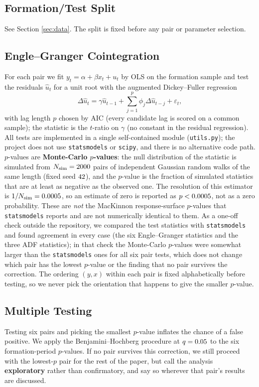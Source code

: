 \documentclass[11pt,a4paper]{article}
\begin{document}
\subsection{Formation/Test Split}
See Section \ref{sec:data}. The split is fixed before any pair or parameter selection.

\subsection{Engle--Granger Cointegration}\label{sec:eg}
For each pair we fit $y_t = \alpha + \beta x_t + u_t$ by OLS on the formation sample and test the residuals $\hat u_t$ for a unit root with the augmented Dickey--Fuller regression
\begin{equation}
\Delta \hat u_t = \gamma \hat u_{t-1} + \sum_{j=1}^{p}\phi_j \Delta \hat u_{t-j} + \varepsilon_t,
\end{equation}
with lag length $p$ chosen by AIC (every candidate lag is scored on a common sample); the statistic is the $t$-ratio on $\gamma$ (no constant in the residual regression). All tests are implemented in a single self-contained module (\texttt{utils.py}); the project does not use \texttt{statsmodels} or \texttt{scipy}, and there is no alternative code path. $p$-values are \textbf{Monte-Carlo $p$-values}: the null distribution of the statistic is simulated from $N_{\text{sim}}=2000{}$ pairs of independent Gaussian random walks of the same length (fixed seed $42{}$), and the $p$-value is the fraction of simulated statistics that are at least as negative as the observed one. The resolution of this estimator is $1/N_{\text{sim}}=0.0005{}$, so an estimate of zero is reported as $p<0.0005{}$, not as a zero probability. These are \emph{not} the MacKinnon response-surface $p$-values that \texttt{statsmodels} reports and are not numerically identical to them. As a one-off check outside the repository, we compared the test statistics with \texttt{statsmodels} and found agreement in every case (the six Engle--Granger statistics and the three ADF statistics); in that check the Monte-Carlo $p$-values were somewhat larger than the \texttt{statsmodels} ones for all six pair tests, which does not change which pair has the lowest $p$-value or the finding that no pair survives the correction. The ordering $(y,x)$ within each pair is fixed alphabetically before testing, so we never pick the orientation that happens to give the smaller $p$-value.

\subsection{Multiple Testing}\label{sec:bh}
Testing six pairs and picking the smallest $p$-value inflates the chance of a false positive. We apply the Benjamini--Hochberg procedure at $q=0.05{}$ to the six formation-period $p$-values. If no pair survives this correction, we still proceed with the lowest-$p$ pair for the rest of the paper, but call the analysis \textbf{exploratory} rather than confirmatory, and say so wherever that pair's results are discussed.
\end{document}
